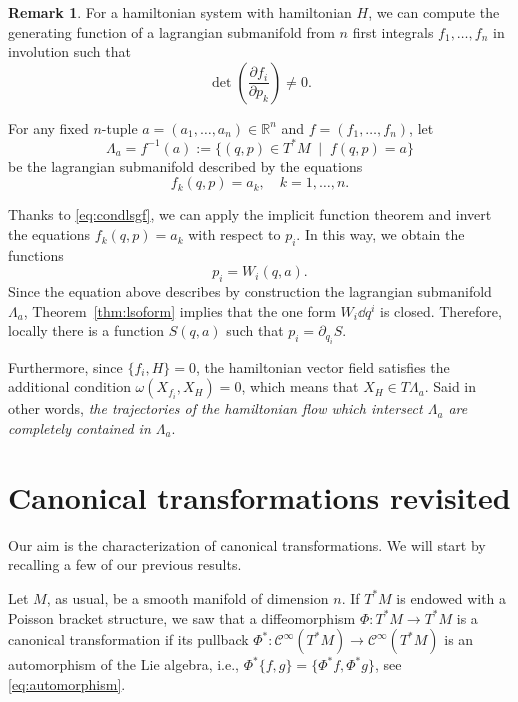 \documentclass[english,fontsize=11pt,paper=b5]{scrbook}
\numberwithin{equation}{chapter}
\theoremstyle{definition}
\newtheorem{remark}{Remark}[chapter]
\begin{document}
    \begin{remark}\label{rmk:nfils}
      For a hamiltonian system with hamiltonian $H$, we can compute the generating function of a lagrangian submanifold from $n$ first integrals $f_1, \ldots, f_n$ in involution such that
      \begin{equation}\label{eq:condlsgf}
        \det\left(\frac{\partial f_i}{\partial p_k}\right) \neq 0.
      \end{equation}

      For any fixed $n$-tuple $a = (a_1, \ldots, a_n) \in \mathbb{R}^n$ and $f=(f_1,\ldots,f_n)$, let
      \begin{equation}
        \Lambda_a = f^{-1}(a) := \{(q,p)\in T^*M \;\mid\; f(q,p) = a\}
      \end{equation}
      be the lagrangian submanifold described by the equations
      \begin{equation}
        f_k(q,p) = a_k, \quad k=1,\ldots,n.
      \end{equation}

      Thanks to \eqref{eq:condlsgf}, we can apply the implicit function theorem and invert the equations $f_k(q,p) = a_k$ with respect to $p_i$. In this way, we obtain the functions
      \begin{equation}
        p_i = W_i(q,a).
      \end{equation}
      Since the equation above describes by construction the lagrangian submanifold $\Lambda_a$, Theorem~\ref{thm:lsoform} implies that the one form $W_i\dd q^i$ is closed.
      Therefore, locally there is a function $S(q, a)$ such that $p_i = \partial_{q_i} S$.

      Furthermore, since $\big\{f_i, H\big\} = 0$, the hamiltonian vector field satisfies the additional condition $\omega(X_{f_i}, X_H) = 0$, which means that $X_H\in T\Lambda_a$. Said in other words, \emph{the trajectories of the hamiltonian flow which intersect $\Lambda_a$ are completely contained in $\Lambda_a$}.
    \end{remark}

    \section{Canonical transformations revisited}

    Our aim is the characterization of canonical transformations.
    We will start by recalling a few of our previous results.

    Let $M$, as usual, be a smooth manifold of dimension $n$.
    If $T^*M$ is endowed with a Poisson bracket structure, we saw that a diffeomorphism $\Phi:T^*M\to T^*M$ is a canonical transformation if its pullback $\Phi^*:\mathcal{C}^\infty(T^*M)\to\mathcal{C}^\infty(T^*M)$ is an automorphism of the Lie algebra, i.e., $\Phi^*\big\{f,g\big\} = \big\{\Phi^* f, \Phi^* g\big\}$, see \eqref{eq:automorphism}.
\end{document}
